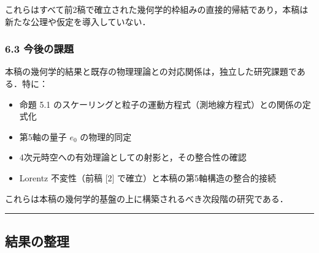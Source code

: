 \documentclass[a4paper,11pt]{ltjsarticle}
\theoremstyle{definition}
\begin{document}
これらはすべて前2稿で確立された幾何学的枠組みの直接的帰結であり，本稿は新たな公理や仮定を導入していない．

\subsubsection{6.3 今後の課題}\label{ux4ecaux5f8cux306eux8ab2ux984c}

本稿の幾何学的結果と既存の物理理論との対応関係は，独立した研究課題である．特に：

\begin{itemize}
\tightlist
\item
  命題 5.1 のスケーリングと粒子の運動方程式（測地線方程式）との関係の定式化
\item
  第5軸の量子 \(e_0\) の物理的同定
\item
  4次元時空への有効理論としての射影と，その整合性の確認
\item
  Lorentz 不変性（前稿 {[}2{]} で確立）と本稿の第5軸構造の整合的接続
\end{itemize}

これらは本稿の幾何学的基盤の上に構築されるべき次段階の研究である．

\begin{center}\rule{0.5\linewidth}{0.5pt}\end{center}

\subsection{結果の整理}\label{ux7d50ux679cux306eux6574ux7406-1}
\end{document}
